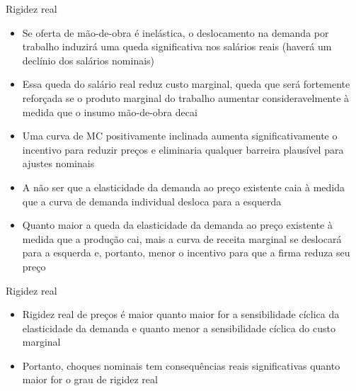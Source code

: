 \documentclass[10pt]{beamer}
\begin{document}
\begin{frame}{Rigidez real}
    \begin{itemize}
        \item Se oferta de mão-de-obra é inelástica, o deslocamento na demanda por trabalho induzirá uma queda significativa nos salários reais (haverá um declínio dos salários nominais)\bigskip
        \item Essa queda do salário real reduz custo marginal, queda que será fortemente reforçada se o produto marginal do trabalho aumentar consideravelmente à medida que o insumo mão-de-obra decai\bigskip
        \item Uma curva de MC positivamente inclinada aumenta significativamente o incentivo para reduzir preços e eliminaria qualquer barreira plausível para ajustes nominais\bigskip
        \item A não ser que a elasticidade da demanda ao preço existente caia à medida que a curva de demanda individual desloca para a esquerda\bigskip
        \item Quanto maior a queda da elasticidade da demanda ao preço existente à medida que a produção cai, mais a curva de receita marginal se deslocará para a esquerda e, portanto, menor o incentivo para que a firma reduza seu preço
    \end{itemize}
\end{frame}

\begin{frame}{Rigidez real}
    \begin{itemize}
        \item Rigidez real de preços é maior quanto maior for a sensibilidade cíclica da elasticidade da demanda e quanto menor a sensibilidade cíclica do custo marginal\bigskip
        \item Portanto, choques nominais tem consequências reais significativas quanto maior for o grau de rigidez real
    \end{itemize}
\end{frame}
\end{document}

